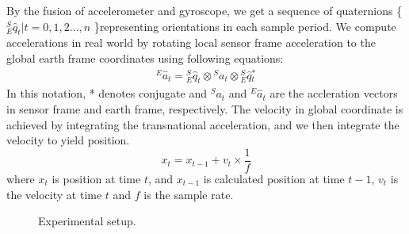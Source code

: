 \documentclass[conference]{IEEEtran}
\begin{document}
    By the fusion of accelerometer and gyroscope, we get a sequence of quaternions \{${^{S}_{E}} \hat{q} _{t}\vert t=0,1,2\dots,n$ \}representing orientations in each sample period. We compute accelerations in real world by rotating local sensor frame acceleration to the global earth frame coordinates using following equations:
    \begin{eqnarray}      
      {^E} \hat{a} _{t}= {^{S}_{E}} \hat{q} _{t} \otimes {^S} a _{t} \otimes {^{S}_{E}} \hat{q} {_{t} ^{*}}
    \end{eqnarray}
    In this notation, * denotes conjugate and ${^S} a _{t}$ and ${^E} \hat{a} _{t}$ are the accleration vectors in sensor frame and earth frame, respectively. The velocity in global coordinate is achieved by integrating the transnational acceleration, and we then integrate the velocity to yield position.
    \begin{equation}
      x_t = x_{t-1} + v_{t}\times  \frac{1}{f}
    \end{equation}
    where $x_t$ is position at time $t$, and $x_{t-1}$ is calculated position at time $t-1$, $v_t$ is the velocity at time $t$ and $f$ is the sample rate.

\begin{figure}[!t]
\centering
{}
\label{fig:labfloor}
\label{fig:labfloorRep}
\caption{Experimental setup.}
\end{figure}
\end{document}
